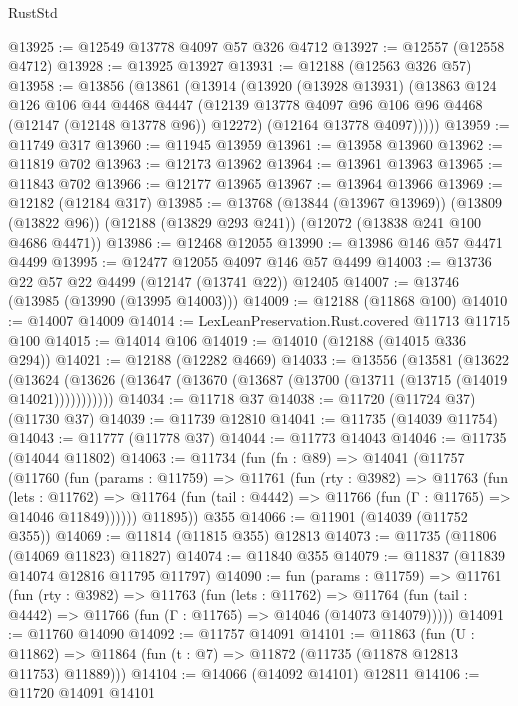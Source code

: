 \begin{lexlean}{RustStd}
\begin{coremodule}
@13925 := @12549 @13778 @4097 @57 @326 @4712
@13927 := @12557 (@12558 @4712)
@13928 := @13925 @13927
@13931 := @12188 (@12563 @326 @57)
@13958 := @13856
    (@13861
      (@13914
        (@13920
          (@13928 @13931)
          (@13863
            @124
            @126
            @106
            @44
            @4468
            @4447
            (@12139 @13778 @4097 @96 @106 @96 @4468 (@12147 (@12148 @13778 @96)) @12272)
            (@12164 @13778 @4097)))))
@13959 := @11749 @317
@13960 := @11945 @13959
@13961 := @13958 @13960
@13962 := @11819 @702
@13963 := @12173 @13962
@13964 := @13961 @13963
@13965 := @11843 @702
@13966 := @12177 @13965
@13967 := @13964 @13966
@13969 := @12182 (@12184 @317)
@13985 := @13768
    (@13844 (@13967 @13969))
    (@13809 (@13822 @96))
    (@12188 (@13829 @293 @241))
    (@12072 (@13838 @241 @100 @4686 @4471))
@13986 := @12468 @12055
@13990 := @13986 @146 @57 @4471 @4499
@13995 := @12477 @12055 @4097 @146 @57 @4499
@14003 := @13736 @22 @57 @22 @4499 (@12147 (@13741 @22)) @12405
@14007 := @13746 (@13985 (@13990 (@13995 @14003)))
@14009 := @12188 (@11868 @100)
@14010 := @14007 @14009
@14014 := LexLeanPreservation.Rust.covered @11713 @11715 @100
@14015 := @14014 @106
@14019 := @14010 (@12188 (@14015 @336 @294))
@14021 := @12188 (@12282 @4669)
@14033 := @13556
    (@13581
      (@13622
        (@13624 (@13626 (@13647 (@13670 (@13687 (@13700 (@13711 (@13715 (@14019 @14021)))))))))))
@14034 := @11718 @37
@14038 := @11720 (@11724 @37) (@11730 @37)
@14039 := @11739 @12810
@14041 := @11735 (@14039 @11754)
@14043 := @11777 (@11778 @37)
@14044 := @11773 @14043
@14046 := @11735 (@14044 @11802)
@14063 := @11734
    (fun (fn : @89) =>
    @14041
      (@11757
        (@11760
          (fun (params : @11759) =>
          @11761
            (fun (rty : @3982) =>
            @11763
              (fun (lets : @11762) =>
              @11764 (fun (tail : @4442) => @11766 (fun (Γ : @11765) => @14046 @11849))))))
        @11895))
    @355
@14066 := @11901 (@14039 (@11752 @355))
@14069 := @11814 (@11815 @355) @12813
@14073 := @11735 (@11806 (@14069 @11823) @11827)
@14074 := @11840 @355
@14079 := @11837 (@11839 @14074 @12816 @11795 @11797)
@14090 := fun (params : @11759) =>
  @11761
    (fun (rty : @3982) =>
    @11763
      (fun (lets : @11762) =>
      @11764 (fun (tail : @4442) => @11766 (fun (Γ : @11765) => @14046 (@14073 @14079)))))
@14091 := @11760 @14090
@14092 := @11757 @14091
@14101 := @11863
    (fun (U : @11862) => @11864 (fun (t : @7) => @11872 (@11735 (@11878 @12813 @11753) @11889)))
@14104 := @14066 (@14092 @14101) @12811
@14106 := @11720 @14091 @14101

\end{coremodule}
\end{lexlean}
